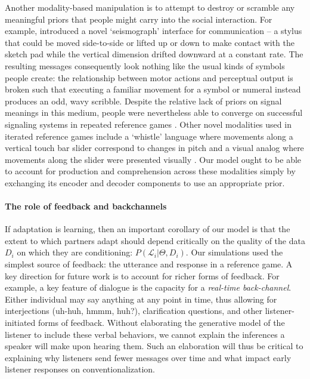 Another modality-based manipulation is to attempt to destroy or scramble any meaningful priors that people might carry into the social interaction.
For example,  introduced a novel `seismograph' interface for communication -- a stylus that could be moved side-to-side or lifted up or down to make contact with the sketch pad while the vertical dimension drifted downward at a constant rate.
The resulting messages consequently look nothing like the usual kinds of symbols people create: the relationship between motor actions and perceptual output is broken such that executing a familiar movement for a symbol or numeral instead produces an odd, wavy scribble.
Despite the relative lack of priors on signal meanings in this medium, people were nevertheless able to converge on successful signaling systems in repeated reference games \cite<see also>{RobertsGalantucci12_DualityOfPatterning,RobertsEtAl15_IconocityOnCombinatoriality}.
Other novel modalities used in iterated reference games include a `whistle' language where movements along a vertical touch bar slider correspond to changes in pitch \cite{VerhoefRobertsDingemanse15_Iconicity} and a visual analog where movements along the slider were presented visually \cite{VerhoefEtAl16_TemporalLanguage}.
Our model ought to be able to account for production and comprehension across these modalities simply by exchanging its encoder and decoder components to use an appropriate prior.

\paragraph{The role of feedback and backchannels}

If adaptation is learning, then an important corollary of our model is that the extent to which partners adapt should depend critically on the quality of the data $D_i$ on which they are conditioning: $P(\mathcal{L}_i | \Theta, D_i)$.
Our simulations used the simplest source of feedback: the utterance and response in a reference game.
A key direction for future work is to account for richer forms of feedback.
For example, a key feature of dialogue is the capacity for a \emph{real-time back-channel}.
Either individual may say anything at any point in time, thus allowing for interjections (uh-huh, hmmm, huh?), clarification questions, and other listener-initiated forms of feedback. 
Without elaborating the generative model of the listener to include these verbal behaviors, we cannot explain the inferences a speaker will make upon hearing them.
Such an elaboration will thus be critical to explaining why listeners send fewer messages over time and what impact early listener responses on conventionalization. 

